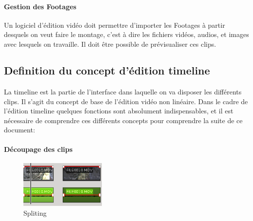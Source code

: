 \paragraph{Gestion des Footages}

Un logiciel d'édition vidéo doit permettre d'importer les Footages
 à partir desquels on veut faire le montage, c'est
à dire les fichiers vidéos, audios, et images avec lesquels on
travaille. Il doit être possible de prévisualiser ces clips.

\subsection{Definition du concept d'édition timeline}

\paragraph{}

La timeline est la partie de l'interface dans laquelle on va disposer
les différents clips. Il s'agit du concept de base de l'édition vidéo
non linéaire.  Dans le cadre de l'édition timeline quelques fonctions
sont absolument indispensables, et il est nécessaire de comprendre ces
différents concepts pour comprendre la suite de ce document:

\paragraph{Découpage des clips}

\begin{figure}

  \vspace{-20pt} \begin{center}

    \includegraphics[width=0.38\textwidth]{images/splited}

  \end{center} \vspace{-20pt} \caption{Spliting} \label{Yes}

  \vspace{-10pt}

\end{figure}

